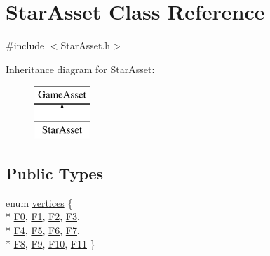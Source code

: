 \hypertarget{classStarAsset}{\section{Star\-Asset Class Reference}
\label{classStarAsset}
}


{\ttfamily \#include $<$Star\-Asset.\-h$>$}

Inheritance diagram for Star\-Asset\-:\begin{figure}[H]
\begin{center}
\leavevmode
\includegraphics[height=2.000000cm]{classStarAsset}
\end{center}
\end{figure}
\subsection*{Public Types}
\begin{DoxyCompactItemize}
\item 
enum \hyperlink{classStarAsset_a39ac8e905b1e0d2eba0b5c27cd223cef}{vertices} \{ \\*
\hyperlink{classStarAsset_a39ac8e905b1e0d2eba0b5c27cd223cefaadcb919baa5887d4a379bdce37833efe}{F0}, 
\hyperlink{classStarAsset_a39ac8e905b1e0d2eba0b5c27cd223cefa170a4b73924ae45dc9f35aeab6a11ec5}{F1}, 
\hyperlink{classStarAsset_a39ac8e905b1e0d2eba0b5c27cd223cefae935994103227f6914fd7479331c156a}{F2}, 
\hyperlink{classStarAsset_a39ac8e905b1e0d2eba0b5c27cd223cefa0d9d6c5db831f400fb3137b01aaa7f6d}{F3}, 
\\*
\hyperlink{classStarAsset_a39ac8e905b1e0d2eba0b5c27cd223cefa46e1bdb884b4d250c1f826b7e29192d0}{F4}, 
\hyperlink{classStarAsset_a39ac8e905b1e0d2eba0b5c27cd223cefae19e6287a83ee0c27375c0ed1bdf4c1b}{F5}, 
\hyperlink{classStarAsset_a39ac8e905b1e0d2eba0b5c27cd223cefa096f0d517df2f8b60264dedaa3bb8adc}{F6}, 
\hyperlink{classStarAsset_a39ac8e905b1e0d2eba0b5c27cd223cefa59bbf4a0df7d231dfe97e19539da411c}{F7}, 
\\*
\hyperlink{classStarAsset_a39ac8e905b1e0d2eba0b5c27cd223cefaeb5ac468dd02d472c35ca71a96819abe}{F8}, 
\hyperlink{classStarAsset_a39ac8e905b1e0d2eba0b5c27cd223cefafaf00a7281e8c2b6ee7c50a6238fffc2}{F9}, 
\hyperlink{classStarAsset_a39ac8e905b1e0d2eba0b5c27cd223cefae5472cbbc494096850a67cd767b7aebb}{F10}, 
\hyperlink{classStarAsset_a39ac8e905b1e0d2eba0b5c27cd223cefac5eddbc625aca62237c12e905700abc0}{F11}
 \}
\end{DoxyCompactItemize}
